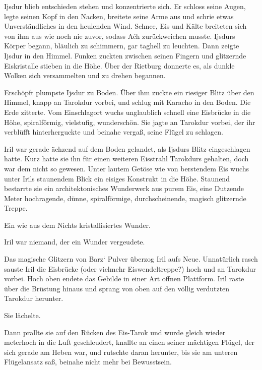 Ijsdur blieb entschieden stehen und konzentrierte sich. Er schloss seine Augen, legte seinen Kopf in den Nacken, breitete seine Arme aus und schrie etwas Unverständliches in den heulenden Wind. Schnee, Eis und Kälte breiteten sich von ihm aus wie noch nie zuvor, sodass Aćh zurückweichen musste. Ijsdurs Körper begann, bläulich zu schimmern, gar taghell zu leuchten. Dann zeigte Ijsdur in den Himmel. Funken zuckten zwischen seinen Fingern und glitzernde Eiskristalle stieben in die Höhe. Über der Rietburg donnerte es, als dunkle Wolken sich versammelten und zu drehen begannen.

Erschöpft plumpste Ijsdur zu Boden. Über ihm zuckte ein riesiger Blitz über den Himmel, knapp an Tarokdur vorbei, und schlug mit Karacho in den Boden. Die Erde zitterte. Vom Einschlagort wuchs unglaublich schnell eine Eisbrücke in die Höhe, spiralförmig, vielstufig, wunderschön. Sie jagte an Tarokdur vorbei, der ihr verblüfft hinterherguckte und beinahe vergaß, seine Flügel zu schlagen.\bigskip







Iril war gerade ächzend auf dem Boden gelandet, als Ijsdurs Blitz eingeschlagen hatte. Kurz hatte sie ihn für einen weiteren Eisstrahl Tarokdurs gehalten, doch war dem nicht so gewesen. Unter lautem Getöse wie von berstendem Eis wuchs unter Irils staunendem Blick ein eisiges Konstrukt in die Höhe. Staunend bestarrte sie ein architektonisches Wunderwerk aus purem Eis, eine Dutzende Meter hochragende, dünne, spiralförmige, durchscheinende, magisch glitzernde Treppe.

Ein wie aus dem Nichts kristallisiertes Wunder.

Iril war niemand, der ein Wunder vergeudete.

Das magische Glitzern von Barz‘ Pulver überzog Iril aufs Neue. Unnatürlich rasch sauste Iril die Eisbrücke (oder vielmehr Eiswendeltreppe?) hoch und an Tarokdur vorbei. Hoch oben endete das Gebilde in einer Art offnen Plattform. Iril raste über die Brüstung hinaus und sprang von oben auf den völlig verdutzten Tarokdur herunter.

Sie lächelte.

Dann prallte sie auf den Rücken des Eis-Tarok und wurde gleich wieder meterhoch in die Luft geschleudert, knallte an einen seiner mächtigen Flügel, der sich gerade am Heben war, und rutschte daran herunter, bis sie am unteren Flügelansatz saß, beinahe nicht mehr bei Bewusstsein.

